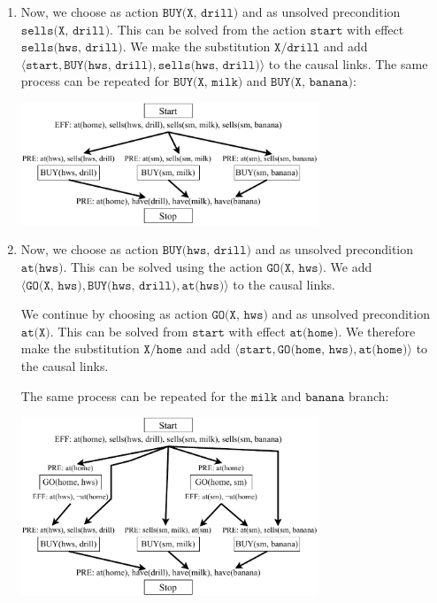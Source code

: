 \begin{example}
\begin{enumerate}
        \item Now, we choose as action $\texttt{BUY(X, drill)}$ and as unsolved precondition $\texttt{sells(X, drill)}$.
            This can be solved from the action $\texttt{start}$ with effect $\texttt{sells(hws, drill)}$.
            We make the substitution $\texttt{X}/\texttt{drill}$ and 
            add $\langle \texttt{start}, \texttt{BUY(hws, drill)}, \texttt{sells(hws, drill)} \rangle$ to the causal links.
            The same process can be repeated for $\texttt{BUY(X, milk)}$ and $\texttt{BUY(X, banana)}$:
            \begin{center}
                \includegraphics[width=0.7\textwidth]{img/_pop_example4.pdf}
            \end{center}

        \item Now, we choose as action $\texttt{BUY(hws, drill)}$ and as unsolved precondition $\texttt{at(hws)}$.
            This can be solved using the action $\texttt{GO(X, hws)}$.
            We add $\langle \texttt{GO(X, hws)}, \texttt{BUY(hws, drill)}, \texttt{at(hws)} \rangle$ to the causal links.

            We continue by choosing as action $\texttt{GO(X, hws)}$ and as unsolved precondition $\texttt{at(X)}$.
            This can be solved from $\texttt{start}$ with effect $\texttt{at(home)}$.
            We therefore make the substitution $\texttt{X}/\texttt{home}$ and 
            add $\langle \texttt{start}, \texttt{GO(home, hws)}, \texttt{at(home)} \rangle$ to the causal links.

            The same process can be repeated for the $\texttt{milk}$ and $\texttt{banana}$ branch:
            \begin{center}
                \includegraphics[width=0.7\textwidth]{img/_pop_example5.pdf}
            \end{center}


\end{enumerate}
\end{example}
